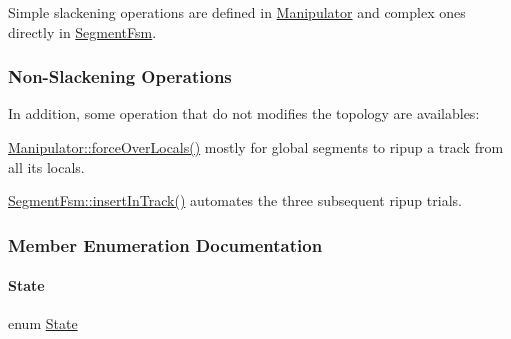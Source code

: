 Simple slackening operations are defined in \mbox{\hyperlink{classKite_1_1Manipulator}{Manipulator}} and complex ones directly in \mbox{\hyperlink{classKite_1_1SegmentFsm}{Segment\+Fsm}}.\hypertarget{classKite_1_1SegmentFsm_secNonSlackening}{}\subsubsection{Non-\/\+Slackening Operations}\label{classKite_1_1SegmentFsm_secNonSlackening}
In addition, some operation that do not modifies the topology are availables\+:
\begin{DoxyEnumerate}
\item \mbox{\hyperlink{classKite_1_1Manipulator_add26b688d75a99a1ae781787eead08d5}{Manipulator\+::force\+Over\+Locals()}} mostly for global segments to ripup a track from all it\textquotesingle{}s locals.
\item \mbox{\hyperlink{classKite_1_1SegmentFsm_a7140b507da2cab137d968a037bed19df}{Segment\+Fsm\+::insert\+In\+Track()}} automates the three subsequent ripup trials. 
\end{DoxyEnumerate}

\subsubsection{Member Enumeration Documentation}
\mbox{\label{classKite_1_1SegmentFsm_a5d74787dedbc4e11c1ab15bf487e61f8}} 
\paragraph{\texorpdfstring{State}{State}}
{\footnotesize\ttfamily enum \mbox{\hyperlink{classKite_1_1SegmentFsm_a5d74787dedbc4e11c1ab15bf487e61f8}{State}}}


